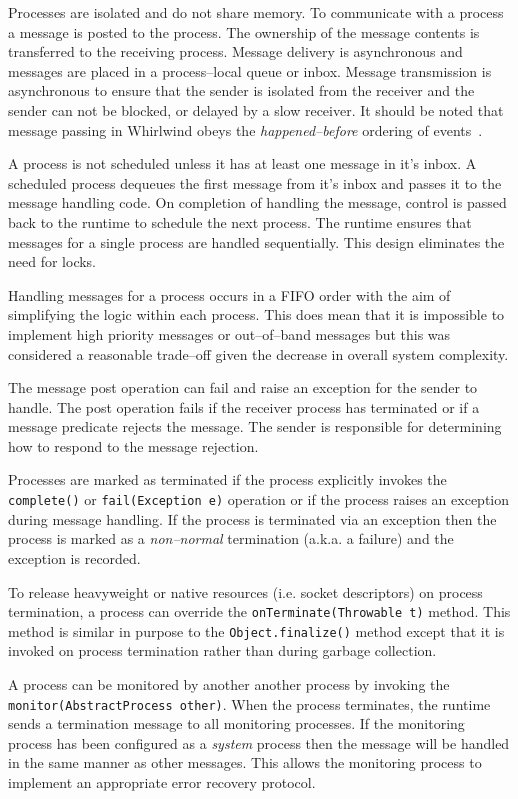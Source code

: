 \documentclass[conference]{IEEEtran}
\begin{document}
Processes are isolated and do not share memory. To communicate with a process a message is posted to the process. The ownership of the message contents is transferred to the receiving process. Message delivery is asynchronous and messages are placed in a process--local queue or inbox. Message transmission is asynchronous to ensure that the sender is isolated from the receiver and the sender can not be blocked, or delayed by a slow receiver. It should be noted that message passing in Whirlwind obeys the \emph{happened--before} ordering of events~\cite{lamport78}.

A process is not scheduled unless it has at least one message in it's inbox. A scheduled process dequeues the first message from it's inbox and passes it to the message handling code. On completion of handling the message, control is passed back to the runtime to schedule the next process. The runtime ensures that messages for a single process are handled sequentially. This design eliminates the need for locks.


Handling messages for a process occurs in a FIFO order with the aim of simplifying the logic within each process. This does mean that it is impossible to implement high priority messages or out--of--band messages but this was considered a reasonable trade--off given the decrease in overall system complexity.

The message post operation can fail and raise an exception for the sender to handle. The post operation fails if the receiver process has terminated or if a message predicate rejects the message. The sender is responsible for determining how to respond to the message rejection.

Processes are marked as terminated if the process explicitly invokes the \verb+complete()+ or \verb+fail(Exception e)+ operation or if the process raises an exception during message handling. If the process is terminated via an exception then the process is marked as a \emph{non--normal} termination (a.k.a. a failure) and the exception is recorded. 

To release heavyweight or native resources (i.e. socket descriptors) on process termination, a process can override the \verb+onTerminate(Throwable t)+ method. This method is similar in purpose to the \verb+Object.finalize()+ method except that it is invoked on process termination rather than during garbage collection. 

A process can be monitored by another another process by invoking the \verb+monitor(AbstractProcess other)+. When the process terminates, the runtime sends a termination message to all monitoring processes. If the monitoring process has been configured as a \emph{system} process then the message will be handled in the same manner as other messages. This allows the monitoring process to implement an appropriate error recovery protocol.
\end{document}
